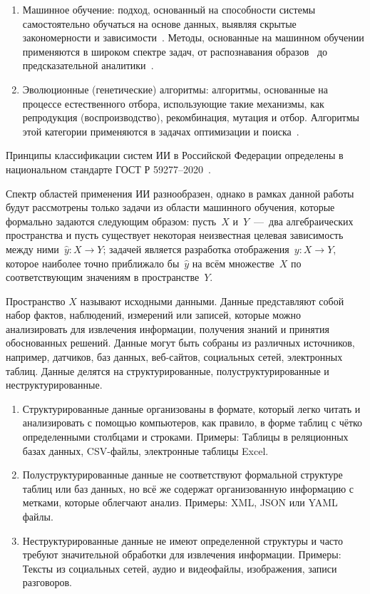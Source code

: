 \begin{itemize}[label=\textbullet]
\begin{enumerate}
        \item Машинное обучение: подход, основанный на способности системы самостоятельно обучаться на основе данных, выявляя скрытые закономерности и зависимости~\cite{joshi, brink, vorontsov, wolf, muller, sarkerml}. Методы, основанные на машинном обучении применяются в широком спектре задач, от распознавания образов~\cite{bishop, singh, fieguth, braga-neto} до предсказательной аналитики~\cite{sghir, sharma, manasa, vjugin}.
        \item Эволюционные (генетические) алгоритмы: алгоритмы, основанные на процессе естественного отбора, использующие такие механизмы, как репродукция (воспроизводство), рекомбинация, мутация и отбор. Алгоритмы этой категории применяются в задачах оптимизации и поиска~\cite{alhijawi, katoch, khan, whitley, dejong, fraser1, fraser2, baricelli57, baricelli62}.
    \end{enumerate}
\end{itemize}
Принципы классификации систем ИИ в Российской Федерации определены в национальном стандарте ГОСТ Р 59277–2020~\cite{gost}.

Спектр областей применения ИИ разнообразен, однако в рамках данной работы будут рассмотрены только задачи из области машинного обучения, которые формально задаются следующим образом: пусть~$X$ и~$Y$~---~два алгебраических пространства и пусть существует некоторая неизвестная целевая зависимость между ними~$\hat{y} : X \to Y$; задачей является разработка отображения~$y : X \to Y$, которое наиболее точно приближало бы~$\hat{y}$ на всём множестве~$X$ по соответствующим значениям в пространстве~$Y$.

Пространство $X$ называют исходными данными. Данные представляют собой набор фактов, наблюдений, измерений или записей, которые можно анализировать для извлечения информации, получения знаний и принятия обоснованных решений. Данные могут быть собраны из различных источников, например, датчиков, баз данных, веб-сайтов, социальных сетей, электронных таблиц. Данные делятся на структурированные, полуструктурированные и неструктурированные. 
\begin{enumerate}
    \item Структурированные данные организованы в формате, который легко читать и анализировать с помощью компьютеров, как правило, в форме таблиц с чётко определенными столбцами и строками. Примеры: Таблицы в реляционных базах данных, CSV-файлы, электронные таблицы Excel.
    \item Полуструктурированные данные не соответствуют формальной структуре таблиц или баз данных, но всё же содержат организованную информацию с метками, которые облегчают анализ. Примеры: XML, JSON или YAML файлы.
    \item Неструктурированные данные не имеют определенной структуры и часто требуют значительной обработки для извлечения информации. Примеры: Тексты из социальных сетей, аудио и видеофайлы, изображения, записи разговоров.
\end{enumerate}

